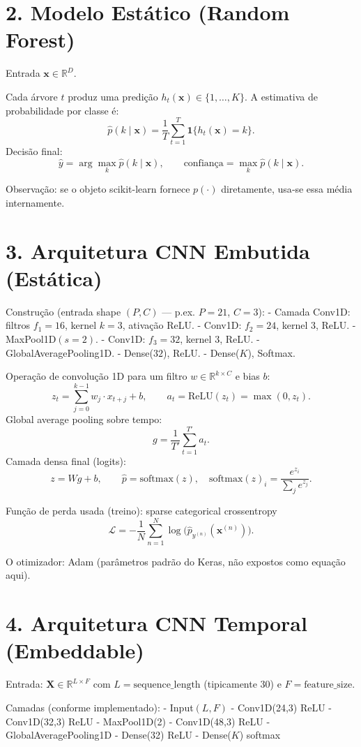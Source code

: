 \documentclass[12pt]{article}
\begin{document}
\section*{2. Modelo Estático (Random Forest)}
Entrada $\mathbf{x}\in\mathbb{R}^D$.

Cada árvore $t$ produz uma predição $h_t(\mathbf{x})\in\{1,\dots,K\}$. A estimativa de probabilidade por classe é:
\[
\hat p(k\mid \mathbf{x}) = \frac{1}{T}\sum_{t=1}^{T} \mathbf{1}\{h_t(\mathbf{x})=k\}.
\]
Decisão final:
\[
\hat y = \arg\max_{k}\hat p(k\mid\mathbf{x}),\qquad
\text{confiança} = \max_k \hat p(k\mid\mathbf{x}).
\]

Observação: se o objeto scikit-learn fornece $p(\cdot)$ diretamente, usa‑se essa média internamente.

\section*{3. Arquitetura CNN Embutida (Estática)}
Construção (entrada shape $(P,C)$ — p.ex. $P=21$, $C=3$):
- Camada Conv1D: filtros $f_1=16$, kernel $k=3$, ativação ReLU.
- Conv1D: $f_2=24$, kernel $3$, ReLU.
- MaxPool1D$(s=2)$.
- Conv1D: $f_3=32$, kernel $3$, ReLU.
- GlobalAveragePooling1D.
- Dense($32$), ReLU.
- Dense($K$), Softmax.

Operação de convolução 1D para um filtro $w\in\mathbb{R}^{k\times C}$ e bias $b$:
\[
z_{t} = \sum_{j=0}^{k-1} w_j\cdot x_{t+j} + b,\qquad a_t=\text{ReLU}(z_t)=\max(0,z_t).
\]
Global average pooling sobre tempo:
\[
g = \frac{1}{T'}\sum_{t=1}^{T'} a_t.
\]
Camada densa final (logits):
\[
z = W g + b,\qquad \hat p = \text{softmax}(z),\quad \text{softmax}(z)_i=\frac{e^{z_i}}{\sum_j e^{z_j}}.
\]

Função de perda usada (treino): sparse categorical crossentropy
\[
\mathcal{L} = -\frac{1}{N}\sum_{n=1}^{N}\log \big(\hat p_{y^{(n)}}(\mathbf{x}^{(n)})\big).
\]

O otimizador: Adam (parâmetros padrão do Keras, não expostos como equação aqui).

\section*{4. Arquitetura CNN Temporal (Embeddable)}
Entrada: $\mathbf{X}\in\mathbb{R}^{L\times F}$ com $L=\text{sequence\_length}$ (tipicamente 30) e $F=\text{feature\_size}$.

Camadas (conforme implementado):
- Input$(L,F)$
- Conv1D(24,3) ReLU
- Conv1D(32,3) ReLU
- MaxPool1D(2)
- Conv1D(48,3) ReLU
- GlobalAveragePooling1D
- Dense(32) ReLU
- Dense($K$) softmax
\end{document}
